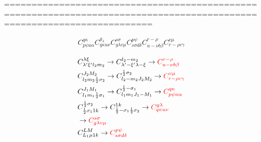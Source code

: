 \documentclass[a4paper]{article}
\newcommand{\red}{\color{red}}
\newcommand{\bmm}[1]{{\color{red}\bm{#1}}}
\begin{document}
=======================================================================================================================

\begin{align}
C_{p\psi a\alpha}^{q\kappa}C_{q\kappa u\nu}^{g_{\lambda}} C_{g\lambda v\mu}^{s\sigma}C_{s\sigma d\delta}^{p\psi} C_{u-\nu b\beta}^{r-\rho} C_{r-\rho c\gamma}^{v\mu}
\end{align}


\begin{align}
&C_{\lambda'\xi' l_{2}m_{2}}^{\lambda\xi}\rightarrow C_{\lambda'-\xi'\lambda-\xi}^{l_{2}-m_{2}}\rightarrow{\red C_{u-\nu b\beta}^{r-\rho}}\\
&C_{l_{2}m_{2}\frac{1}{2}\sigma_{2}}^{J_{2}M_{2}}\rightarrow C_{l_{2}-m_{2}J_{2}M_{2}}^{\frac{1}{2}\sigma_{2}}\rightarrow{\red C_{r-\rho c\gamma}^{v\mu}}\\
&C_{l_{1}m_{1}\frac{1}{2}\sigma_{1}}^{J_{1}M_{1}}\rightarrow C_{l_{1}m_{1}J_{1}-M_{1}}^{\frac{1}{2}-\sigma_{1}}\rightarrow{\red C_{p\psi a\alpha}^{q\kappa}}\\
&C_{\frac{1}{2}\sigma_{1}1k}^{\frac{1}{2}\sigma_{2}}\rightarrow C_{\frac{1}{2}-\sigma_{1}\frac{1}{2}\sigma_{2}}^{1k}\rightarrow{\red C_{q\kappa u\nu}^{g\lambda}}\\
&\rightarrow{\red C_{g\lambda v\mu}^{s\sigma}}\\
&C_{L_{1}\mu 1k}^{LM}\rightarrow{\red C_{s\sigma d\delta}^{p\psi}}
\end{align}


\clearpage
\end{document}
